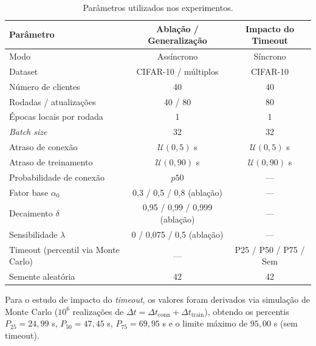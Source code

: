 \documentclass[12pt, a4paper]{article}
\begin{document}
\begin{table}[H]
\centering
\caption{Parâmetros utilizados nos experimentos.}
\label{tab:params}
\renewcommand{\arraystretch}{1.25}
\begin{tabular}{lcc}
\toprule
\textbf{Parâmetro} & \textbf{Ablação / Generalização} & \textbf{Impacto do Timeout} \\
\midrule
Modo                                   & Assíncrono            & Síncrono              \\
Dataset                                & CIFAR-10 / múltiplos  & CIFAR-10              \\
Número de clientes                     & 40                    & 40                    \\
Rodadas / atualizações                 & 40 / 80               & 80                    \\
Épocas locais por rodada               & 1                     & 1                     \\
\textit{Batch size}                    & 32                    & 32                    \\
Atraso de conexão                      & $\mathcal{U}(0,5)$ s  & $\mathcal{U}(0,5)$ s  \\
Atraso de treinamento                  & $\mathcal{U}(0,90)$ s & $\mathcal{U}(0,90)$ s \\
Probabilidade de conexão               & $p50$                 & —                     \\
Fator base $\alpha_0$                  & 0{,}3 / 0{,}5 / 0{,}8 (ablação) & —           \\
Decaimento $\delta$                    & 0{,}95 / 0{,}99 / 0{,}999 (ablação) & —       \\
Sensibilidade $\lambda$                   & 0 / 0{,}075 / 0{,}5 (ablação) & —             \\
Timeout (percentil via Monte Carlo)    & —                     & P25 / P50 / P75 / Sem \\
Semente aleatória                      & 42                    & 42                    \\
\bottomrule
\end{tabular}
\end{table}

Para o estudo de impacto do \textit{timeout}, os valores foram derivados via simulação
de Monte Carlo ($10^6$ realizações de $\Delta t = \Delta t_{\text{conn}} + \Delta t_{\text{train}}$),
obtendo os percentis $P_{25} = 24{,}99$ s, $P_{50} = 47{,}45$ s, $P_{75} = 69{,}95$ s
e o limite máximo de $95{,}00$ s (sem timeout).
\end{document}
